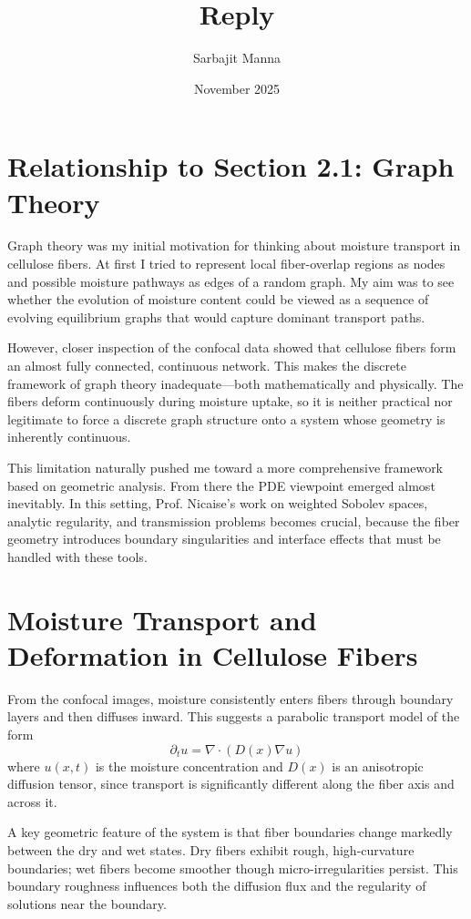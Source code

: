 \documentclass[11pt]{article}
\title{\textbf{Reply}}
\author{Sarbajit Manna}
\date{November 2025}
\begin{document}
\maketitle

\section{Relationship to Section 2.1: Graph Theory}

Graph theory was my initial motivation for thinking about moisture transport in cellulose fibers. At first I tried to represent local fiber-overlap regions as nodes and possible moisture pathways as edges of a random graph. My aim was to see whether the evolution of moisture content could be viewed as a sequence of evolving equilibrium graphs that would capture dominant transport paths.

However, closer inspection of the confocal data showed that cellulose fibers form an almost fully connected, continuous network. This makes the discrete framework of graph theory inadequate—both mathematically and physically. The fibers deform continuously during moisture uptake, so it is neither practical nor legitimate to force a discrete graph structure onto a system whose geometry is inherently continuous.

This limitation naturally pushed me toward a more comprehensive framework based on geometric analysis. From there the PDE viewpoint emerged almost inevitably. In this setting, Prof. Nicaise’s work on weighted Sobolev spaces, analytic regularity, and transmission problems becomes crucial, because the fiber geometry introduces boundary singularities and interface effects that must be handled with these tools.

\section{Moisture Transport and Deformation in Cellulose Fibers}

From the confocal images, moisture consistently enters fibers through boundary layers and then diffuses inward. This suggests a parabolic transport model of the form
 \[
 \partial_t u = \nabla \cdot (D(x)\nabla u)
 \]
where $u(x, t)$ is the moisture concentration and $D(x)$ is an anisotropic diffusion tensor, since transport is significantly different along the fiber axis and across it. 
 
A key geometric feature of the system is that fiber boundaries change markedly between the dry and wet states. Dry fibers exhibit rough, high-curvature boundaries; wet fibers become smoother though micro-irregularities persist. This boundary roughness influences both the diffusion flux and the regularity of solutions near the boundary.
\end{document}
